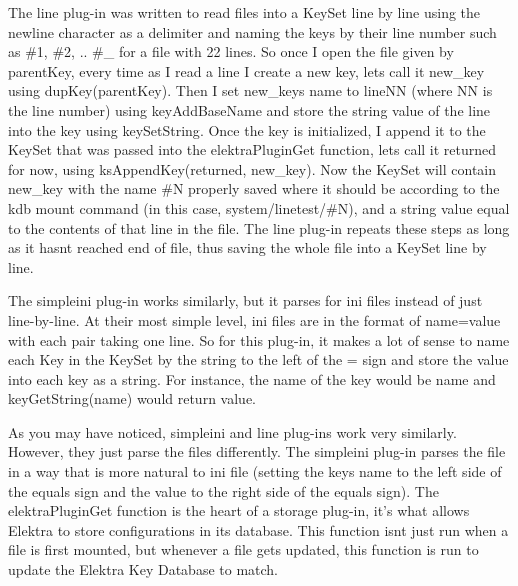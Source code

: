 The line plug-\/in was written to read files into a {\ttfamily Key\+Set} line by line using the newline character as a delimiter and naming the keys by their line number such as {\ttfamily \#1}, {\ttfamily \#2}, .. {\ttfamily \#\+\_} for a file with 22 lines. So once I open the file given by {\ttfamily parent\+Key}, every time as I read a line I create a new key, let\textquotesingle{}s call it {\ttfamily new\+\_\+key} using {\ttfamily dup\+Key(parent\+Key)}. Then I set {\ttfamily new\+\_\+key}\textquotesingle{}s name to {\ttfamily line\+NN} (where NN is the line number) using {\ttfamily key\+Add\+Base\+Name} and store the string value of the line into the key using {\ttfamily key\+Set\+String}. Once the key is initialized, I append it to the {\ttfamily Key\+Set} that was passed into the {\ttfamily elektra\+Plugin\+Get} function, let\textquotesingle{}s call it {\ttfamily returned} for now, using {\ttfamily ks\+Append\+Key(returned, new\+\_\+key)}. Now the {\ttfamily Key\+Set} will contain {\ttfamily new\+\_\+key} with the name {\ttfamily \#N} properly saved where it should be according to the {\ttfamily kdb mount} command (in this case, {\ttfamily system/linetest/\#N}), and a string value equal to the contents of that line in the file. The line plug-\/in repeats these steps as long as it hasn\textquotesingle{}t reached end of file, thus saving the whole file into a {\ttfamily Key\+Set} line by line.

The {\ttfamily simpleini} plug-\/in works similarly, but it parses for {\ttfamily ini} files instead of just line-\/by-\/line. At their most simple level, {\ttfamily ini} files are in the format of {\ttfamily name=value} with each pair taking one line. So for this plug-\/in, it makes a lot of sense to name each {\ttfamily Key} in the {\ttfamily Key\+Set} by the string to the left of the {\ttfamily =} sign and store the value into each key as a string. For instance, the name of the key would be {\ttfamily name} and {\ttfamily key\+Get\+String(name)} would return {\ttfamily value}.

As you may have noticed, {\ttfamily simpleini} and line plug-\/ins work very similarly. However, they just parse the files differently. The {\ttfamily simpleini} plug-\/in parses the file in a way that is more natural to {\ttfamily ini} file (setting the key\textquotesingle{}s name to the left side of the equals sign and the value to the right side of the equals sign). The {\ttfamily elektra\+Plugin\+Get} function is the heart of a storage plug-\/in, it’s what allows Elektra to store configurations in its database. This function isn\textquotesingle{}t just run when a file is first mounted, but whenever a file gets updated, this function is run to update the Elektra Key Database to match.

